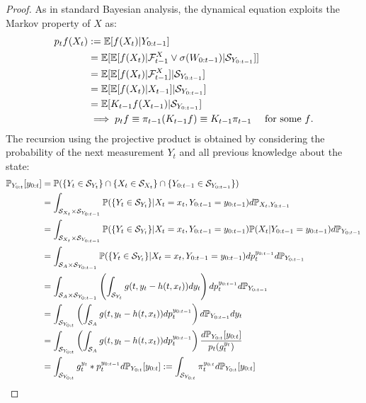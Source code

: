 \begin{lemma}
	\begin{proof}
	As in standard Bayesian analysis, the dynamical equation exploits the Markov property of $X$ as:
	\begin{align}
p_tf(X_t)  & :=  \mathbb{E}[f(X_t) |  Y_{0:t-1}]  \\
	&=  \mathbb{E}[ \mathbb{E}[f(X_t) |   \mathcal{F}^X_{t-1} \vee \sigma(W_{0:t-1}) | \mathcal{S}_{Y_{0:t-1}} ] ] \\
	&=\mathbb{E}[ \mathbb{E}[f(X_t) |   \mathcal{F}^X_{t-1}] | \mathcal{S}_{Y_{0:t-1}} ] \\
	&=\mathbb{E}[ \mathbb{E}[f(X_t) | X_{t-1}] | \mathcal{S}_{Y_{0:t-1}} ] \\
	&=\mathbb{E}[K_{t-1} f(X_{t-1}) | \mathcal{S}_{Y_{0:t-1}} ] \\
   &\implies p_t f \equiv \pi_{t-1} (K_{t-1} f) \equiv K_{t-1} \pi_{t-1} \quad  \text{ for some $f$.}
	\end{align}
	The recursion using the projective product is obtained by considering the probability of the next measurement $Y_t$ and all previous knowledge about the state:
	\begin{align}
	\measure{Y_{0:t}}{y_{0:t}} &= \mathbb{P} (\{Y_t \in \mathcal{S}_{Y_t} \}\cap \{X_t \in \mathcal{S}_{X_t} \} \cap \{ Y_{0:t-1} \in \mathcal{S}_{Y_{0:t-1}}\} ) \\
	&= \int_{\mathcal{S}_{X_t} \times \mathcal{S}_{Y_{0:t-1}}} \mathbb{P} (\{Y_t \in \mathcal{S}_{Y_t} \} | X_t =x_t, Y_{0:t-1}= y_{0:t-1}) d\mathbb{P}_{X_t, Y_{0:t-1}} \\
	&= \int_{\mathcal{S}_{X_t} \times \mathcal{S}_{Y_{0:t-1}}} \mathbb{P} (\{Y_t \in \mathcal{S}_{Y_t} \} | X_t =x_t, Y_{0:t-1}= y_{0:t-1}) \mathbb{P} (X_t | Y_{0:t-1}= y_{0:t-1})  d\mathbb{P}_{ Y_{0:t-1}} \\
	&= \int_{\mathcal{S}_{A} \times \mathcal{S}_{Y_{0:t-1}}} \mathbb{P} (\{Y_t \in \mathcal{S}_{Y_t} \} | X_t =x_t, Y_{0:t-1}= y_{0:t-1}) dp_t^{y_{0:t-1}} d\mathbb{P}_{Y_{0:t-1}} \\
	&= \int_{\mathcal{S}_{A} \times \mathcal{S}_{Y_{0:t-1}}} \left(\int_{ \mathcal{S}_{Y_t}} g(t, y_t - h(t, x_t))  dy_t \right) dp_t^{y_{0:t-1}} d\mathbb{P}_{Y_{0:t-1}} \\
	&= \int_{\mathcal{S}_{Y_{0:t}}} \left(\int_{ \mathcal{S}_{A}} g(t, y_t - h(t, x_t))  dp_t^{y_{0:t-1}} \right) d\mathbb{P}_{Y_{0:t-1}} dy_t\\
	&= \int_{\mathcal{S}_{Y_{0:t}}} \left(\int_{ \mathcal{S}_{A}} g(t, y_t - h(t, x_t))  dp_t^{y_{0:t-1}} \right) \frac{d\measure{Y_{0:t}}{y_{0:t}}}{p_t(g_t^{y_t})}\\
	&= \int_{\mathcal{S}_{Y_{0:t}}} g_t^{y_t} * p_t^{y_{0:t-1}} d\measure{Y_{0:t}}{y_{0:t}} := \int_{\mathcal{S}_{Y_{0:t}}} \pi_t^{y_{0:t}}d\measure{Y_{0:t}}{y_{0:t}}

\end{align}
\end{proof}
\end{lemma}
